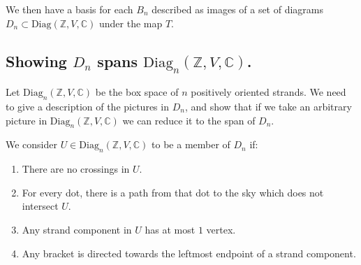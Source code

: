 \documentclass[11pt]{article} %
\begin{document}
 We then have a basis for each $B_n$ described as images of a set of diagrams $D_n \subset \text{Diag}{(\mathbb{Z},V,\mathbb{C})}$ under the map $T$.

\subsection{Showing $D_n$ spans $\text{Diag}_n(\mathbb{Z},V,\mathbb{C})$.}

Let $\text{Diag}_n(\mathbb{Z},V,\mathbb{C})$ be the box space of $n$ positively oriented strands. We need to give a description of the pictures in $D_n$, and show that if we take an arbitrary picture in $\text{Diag}_n(\mathbb{Z},V,\mathbb{C})$ we can reduce it to the span of $D_n$.

\begin{mydef} We consider $U \in \text{Diag}_n(\mathbb{Z},V,\mathbb{C})$ to be a member of $D_n$ if:
\begin{enumerate}
\item There are no crossings in $U$.
\item For every dot, there is a path from that dot to the sky which does not intersect $U$.
\item Any strand component in $U$ has at most $1$ vertex.
\item Any bracket is directed towards the leftmost endpoint of a strand component.
\end{enumerate}
\end{mydef}
\end{document}
